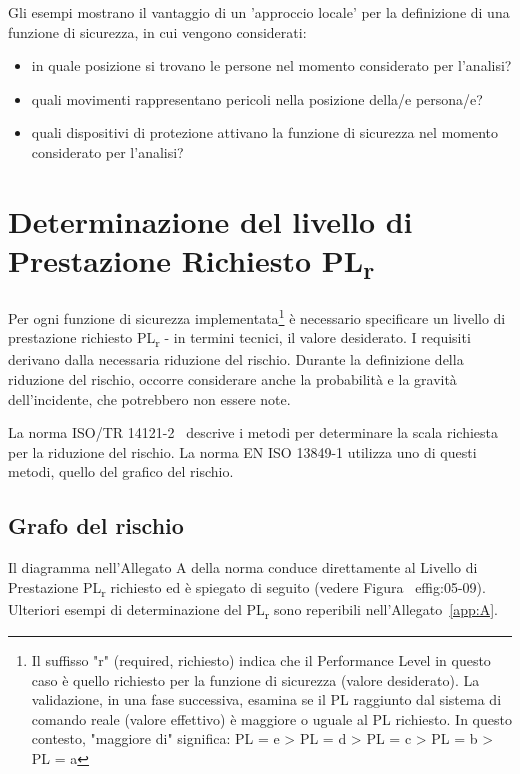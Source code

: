 Gli esempi mostrano il vantaggio di un 'approccio locale' per la definizione di una funzione di sicurezza, in cui vengono considerati:

\begin{itemize}
	\item in quale posizione si trovano le persone nel momento considerato per l'analisi?
	\item quali movimenti rappresentano pericoli nella posizione della/e persona/e?
    \item quali dispositivi di protezione attivano la funzione di sicurezza nel momento considerato per l'analisi?
\end{itemize}

\section{Determinazione del livello di Prestazione Richiesto \texorpdfstring{PL\textsubscript{\small r}}{PLr}}
\label{sec:05-4}
Per ogni funzione di sicurezza implementata\footnote{Il suffisso "r" (required, richiesto) indica che il Performance Level in questo caso è quello richiesto per la funzione di sicurezza (valore desiderato). La validazione, in una fase successiva, esamina se il PL raggiunto dal sistema di comando reale (valore effettivo) è maggiore o uguale al PL richiesto. In questo contesto, "maggiore di" significa: PL = e > PL = d > PL = c > PL = b > PL = a}  è necessario specificare un livello di prestazione richiesto PL\textsubscript{r} - in termini tecnici, il valore desiderato. I requisiti derivano dalla necessaria riduzione del rischio. Durante la definizione della riduzione del rischio, occorre considerare anche la probabilità e la gravità dell'incidente, che potrebbero non essere note.

La norma ISO/TR 14121-2~\cite{isotr14121-2} descrive i metodi per determinare la scala richiesta per la riduzione del rischio. La norma EN ISO 13849-1 utilizza uno di questi metodi, quello del grafico del rischio.

\subsection{Grafo del rischio}
\label{subsec:05-4-1}
Il diagramma nell'Allegato A della norma conduce direttamente al Livello di Prestazione PL\textsubscript{\small r} richiesto ed è spiegato di seguito (vedere Figura~
ef{fig:05-09}). Ulteriori esempi di determinazione del PL\textsubscript{\small r} sono reperibili nell'Allegato~\ref{app:A}.

